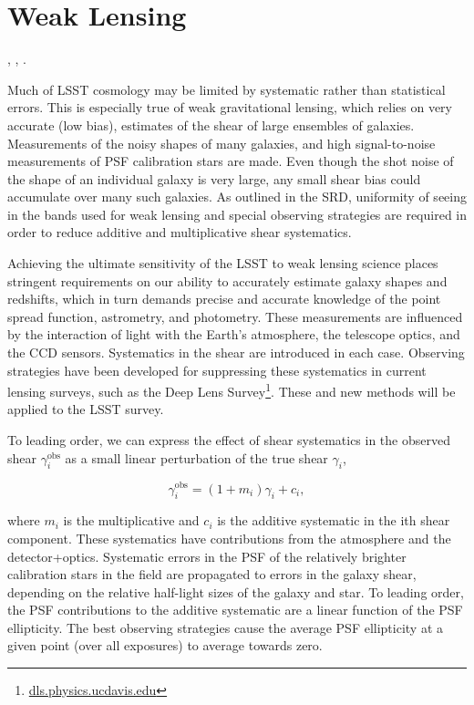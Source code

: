 %
%

\newcommand{\red}[1]{\textcolor{red}{#1}}

\clearpage
\section{Weak Lensing}
\def\secname{wl}\label{sec:\secname}

,
,
.

Much of LSST cosmology may be limited by systematic rather than statistical
errors.  This is especially true of weak gravitational lensing, which relies on
very accurate (\ie low bias), estimates of the shear of large ensembles of
galaxies. Measurements of the noisy shapes of many galaxies, and high
signal-to-noise measurements of PSF calibration stars are made.   Even though
the shot noise of the shape of an individual galaxy is very large, any small
shear bias could accumulate over many such galaxies.  As outlined in the SRD,
uniformity of seeing in the bands used for weak lensing and special observing
strategies are required in order to reduce additive and multiplicative shear
systematics.

Achieving the ultimate sensitivity of the LSST to weak lensing science places
stringent requirements on our ability to accurately estimate galaxy shapes and
redshifts, which in turn demands precise and accurate knowledge of the point
spread function, astrometry, and photometry.  These measurements are influenced
by the interaction of light with the Earth's atmosphere, the telescope optics,
and the CCD sensors.  Systematics in the shear are introduced in each case.
Observing strategies have been developed for suppressing these systematics in
current lensing surveys, such as the Deep Lens
Survey\footnote{\url{dls.physics.ucdavis.edu}}.  These and new methods will be
applied to the LSST survey.

To leading order, we can express the effect of shear systematics in the observed
shear $\gamma^\mathrm{obs}_i$ as a small linear perturbation of the true shear
$\gamma_i$,

$$ \gamma_i^\mathrm{obs} = (1+m_i) \gamma_i + c_i, $$

where $m_i$ is the multiplicative and $c_i$ is the additive systematic in the
ith shear component.  These systematics have contributions from the atmosphere
and the detector+optics.  Systematic errors in the PSF of the relatively
brighter calibration stars in the field are propagated to errors in the galaxy
shear, depending on the relative half-light sizes of the  galaxy and star.  To
leading order, the PSF contributions to the additive systematic are a linear
function of the PSF ellipticity.  The best observing strategies cause the
average PSF ellipticity at a given point (over all exposures) to average towards
zero.

